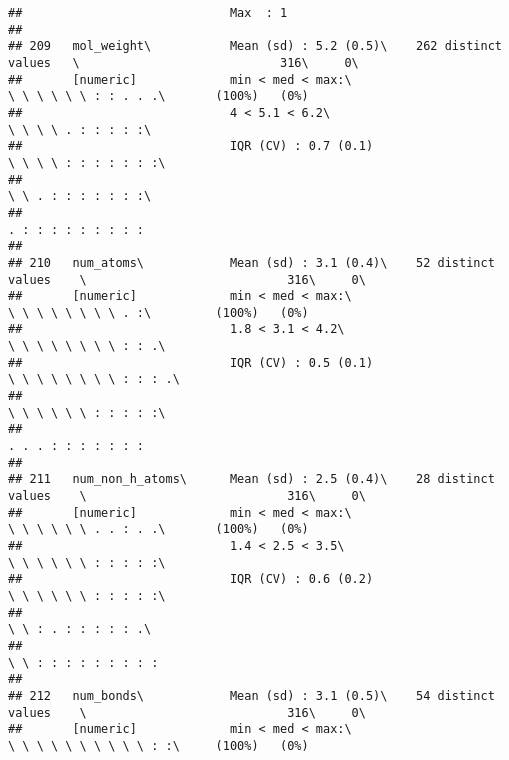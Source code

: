 \documentclass[]{article}
\begin{document}
\begin{verbatim}
##                             Max  : 1                                                                                       
## 
## 209   mol_weight\           Mean (sd) : 5.2 (0.5)\    262 distinct values   \                            316\     0\       
##       [numeric]             min < med < max:\                               \ \ \ \ \ \ : : . . .\       (100%)   (0%)     
##                             4 < 5.1 < 6.2\                                  \ \ \ \ . : : : : :\                           
##                             IQR (CV) : 0.7 (0.1)                            \ \ \ \ : : : : : : :\                         
##                                                                             \ \ . : : : : : : :\                           
##                                                                             . : : : : : : : : :                            
## 
## 210   num_atoms\            Mean (sd) : 3.1 (0.4)\    52 distinct values    \                            316\     0\       
##       [numeric]             min < med < max:\                               \ \ \ \ \ \ \ \ . :\         (100%)   (0%)     
##                             1.8 < 3.1 < 4.2\                                \ \ \ \ \ \ \ \ : : .\                         
##                             IQR (CV) : 0.5 (0.1)                            \ \ \ \ \ \ \ \ : : : .\                       
##                                                                             \ \ \ \ \ \ : : : : :\                         
##                                                                             . . . : : : : : : :                            
## 
## 211   num_non_h_atoms\      Mean (sd) : 2.5 (0.4)\    28 distinct values    \                            316\     0\       
##       [numeric]             min < med < max:\                               \ \ \ \ \ \ . . : . .\       (100%)   (0%)     
##                             1.4 < 2.5 < 3.5\                                \ \ \ \ \ \ : : : : :\                         
##                             IQR (CV) : 0.6 (0.2)                            \ \ \ \ \ \ : : : : :\                         
##                                                                             \ \ : . : : : : : .\                           
##                                                                             \ \ : : : : : : : : :                          
## 
## 212   num_bonds\            Mean (sd) : 3.1 (0.5)\    54 distinct values    \                            316\     0\       
##       [numeric]             min < med < max:\                               \ \ \ \ \ \ \ \ \ \ : :\     (100%)   (0%)     

\end{verbatim}
\end{document}

